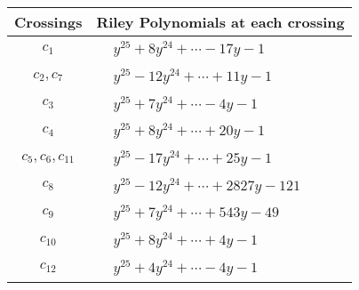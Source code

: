 \documentclass[1p]{elsarticle_modified}
\theoremstyle{definition}
\begin{document}
\begin{tabular}{m{50pt}|m{274pt}}
Crossings & \hspace{64pt}Riley Polynomials at each crossing \\
\hline $$\begin{aligned}c_{1}\end{aligned}$$&$\begin{aligned}
&y^{25}+8 y^{24}+\cdots-17 y-1
\end{aligned}$\\
\hline $$\begin{aligned}c_{2},c_{7}\end{aligned}$$&$\begin{aligned}
&y^{25}-12 y^{24}+\cdots+11 y-1
\end{aligned}$\\
\hline $$\begin{aligned}c_{3}\end{aligned}$$&$\begin{aligned}
&y^{25}+7 y^{24}+\cdots-4 y-1
\end{aligned}$\\
\hline $$\begin{aligned}c_{4}\end{aligned}$$&$\begin{aligned}
&y^{25}+8 y^{24}+\cdots+20 y-1
\end{aligned}$\\
\hline $$\begin{aligned}c_{5},c_{6},c_{11}\end{aligned}$$&$\begin{aligned}
&y^{25}-17 y^{24}+\cdots+25 y-1
\end{aligned}$\\
\hline $$\begin{aligned}c_{8}\end{aligned}$$&$\begin{aligned}
&y^{25}-12 y^{24}+\cdots+2827 y-121
\end{aligned}$\\
\hline $$\begin{aligned}c_{9}\end{aligned}$$&$\begin{aligned}
&y^{25}+7 y^{24}+\cdots+543 y-49
\end{aligned}$\\
\hline $$\begin{aligned}c_{10}\end{aligned}$$&$\begin{aligned}
&y^{25}+8 y^{24}+\cdots+4 y-1
\end{aligned}$\\
\hline $$\begin{aligned}c_{12}\end{aligned}$$&$\begin{aligned}
&y^{25}+4 y^{24}+\cdots-4 y-1
\end{aligned}$\\
\hline
\end{tabular}\\~\\
\end{document}
